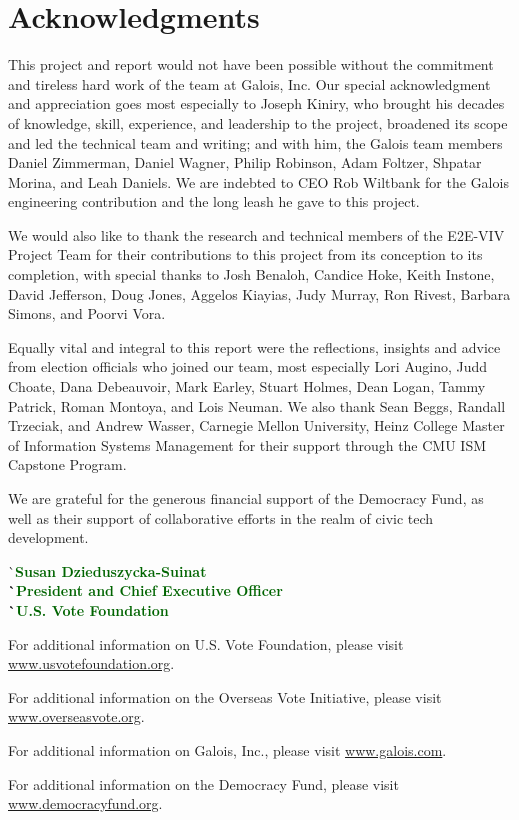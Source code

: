 \chapter*{Acknowledgments}
\label{chapter:acknowledgments}

This project and report would not have been possible without the
commitment and tireless hard work of the team at Galois, Inc. Our
special acknowledgment and appreciation goes most especially to Joseph
Kiniry, who brought his decades of knowledge, skill, experience, and
leadership to the project, broadened its scope and led the technical
team and writing; and with him, the Galois team members Daniel
Zimmerman, Daniel Wagner, Philip Robinson, Adam Foltzer, Shpatar
Morina, and Leah Daniels. We are indebted to CEO Rob Wiltbank for the
Galois engineering contribution and the long leash he gave to this
project.

We would also like to thank the research and technical members of the
E2E-VIV Project Team for their contributions to this project from its
conception to its completion, with special thanks to Josh Benaloh,
Candice Hoke, Keith Instone, David Jefferson, Doug Jones, Aggelos
Kiayias, Judy Murray, Ron Rivest, Barbara Simons, and Poorvi Vora.

Equally vital and integral to this report were the reflections,
insights and advice from election officials who joined our team, most
especially Lori Augino, Judd Choate, Dana Debeauvoir, Mark Earley,
Stuart Holmes, Dean Logan, Tammy Patrick, Roman Montoya, and Lois
Neuman.  We also thank Sean Beggs, Randall Trzeciak, and Andrew
Wasser, Carnegie Mellon University, Heinz College Master of
Information Systems Management for their support through the CMU ISM
Capstone Program.

We are grateful for the generous financial support of the Democracy
Fund, as well as their support of collaborative efforts in the realm
of civic tech development.


\begin{tabbing}
\` \sffamily\bfseries\textcolor{DarkGreen}{Susan Dzieduszycka-Suinat} \\
\` \sffamily\textcolor{DarkGreen}{President and Chief Executive Officer} \\
\` \sffamily\textcolor{DarkGreen}{U.S. Vote Foundation}
\end{tabbing}

\vspace{\fill}

For additional information on U.S. Vote Foundation, please visit
\url{www.usvotefoundation.org}.   

For additional information on the Overseas Vote Initiative, please
visit \url{www.overseasvote.org}. 

For additional information on Galois, Inc., please visit
\url{www.galois.com}.

For additional information on the Democracy Fund, please visit
\url{www.democracyfund.org}.

